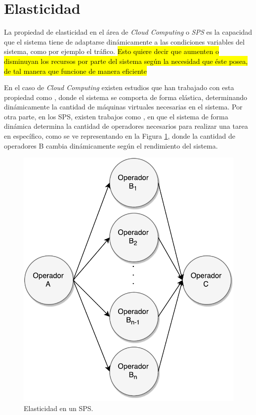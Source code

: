 \section{Elasticidad}
\label{sec:elasticidad}

La propiedad de elasticidad en el área de \textit{Cloud Computing} o \textit{SPS} es la capacidad que el sistema tiene de adaptarse dinámicamente a las condiciones variables del sistema, como por ejemplo el tráfico. \hl{Esto quiere decir que aumenten o disminuyan los recursos por parte del sistema según la necesidad que éste posea, de tal manera que funcione de manera eficiente} \citep{kelly2014elasticity}

En el caso de \textit{Cloud Computing} existen estudios que han trabajado con esta propiedad como \citep{GongGW10, NguyenSGSW13, LehrigEB15}, donde el sistema se comporta de forma elástica, determinando dinámicamente la cantidad de máquinas virtuales necesarias en el sistema. Por otra parte, en los SPS, existen trabajos como \citep{GedikSHW14, IshiiS11, SchneiderAGBW09, MadsenTZ14, GulisanoJPSV12}, en que el sistema de forma dinámica determina la cantidad de operadores necesarios para realizar una tarea en específico, como se ve representando en la Figura \ref{fig:elasticidad}, donde la cantidad de operadores B cambia dinámicamente según el rendimiento del sistema.

\begin{figure}[!ht]
	\centering
	\includegraphics[scale=0.55]{images/Elasticidad.pdf}
	\caption{Elasticidad en un SPS.}
	\label{fig:elasticidad}
\end{figure}

